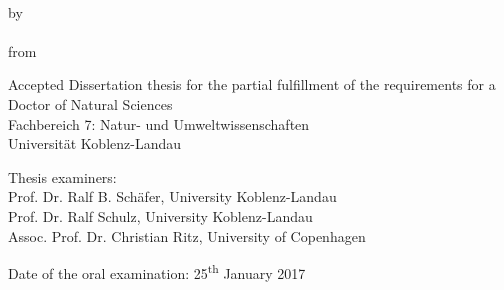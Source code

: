 
\begin{titlepage}
    \begin{center}
        \begingroup
            \vspace{5cm}
            \textbf{\LARGE\spacedallcaps{\myTitleOnTitlePageLineOne}}\\[0.5em]
            \spacedallcaps{\myTitleOnTitlePageLineTwo}
        \endgroup
        
        \vfill

        \begingroup
            by\\[1em]
            \Large \spacedlowsmallcaps{\myName} \\
            \small from \spacedlowsmallcaps{\myLocation}
        \endgroup

        \vfill

        \begingroup
            \small
            Accepted Dissertation thesis for the partial fulfillment of the requirements for a \\
            Doctor of Natural Sciences \\
            Fachbereich 7: Natur- und Umweltwissenschaften \\
            Universität Koblenz-Landau
        \endgroup

        \vfill

        \begingroup
            \small
            Thesis examiners: \\
            Prof. Dr. Ralf B. Schäfer, University Koblenz-Landau \\
            Prof. Dr. Ralf Schulz, University Koblenz-Landau\\
            Assoc. Prof. Dr. Christian Ritz, University of Copenhagen
        \endgroup

        \vfill

        \begingroup
            \small
            Date of the oral examination: 25\textsuperscript{th} January 2017
        \endgroup
                           

    \end{center}       
\end{titlepage}   
 
